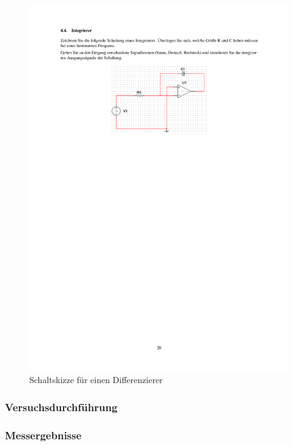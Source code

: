 \documentclass[12pt,a4paper]{article}
\begin{document}
\begin{figure}[H] 
  \centering
    \includegraphics[trim = 10mm 180mm 10mm 50mm, clip, scale = 1]{ep5_14[Page20].pdf}
  	\caption[Schaltskizze für einen Differenzierer]{Schaltskizze für einen Differenzierer\footnotemark}
  \label{fig:1}
\end{figure}

\subsubsection{Versuchsdurchführung}

\subsubsection{Messergebnisse}
\end{document}
